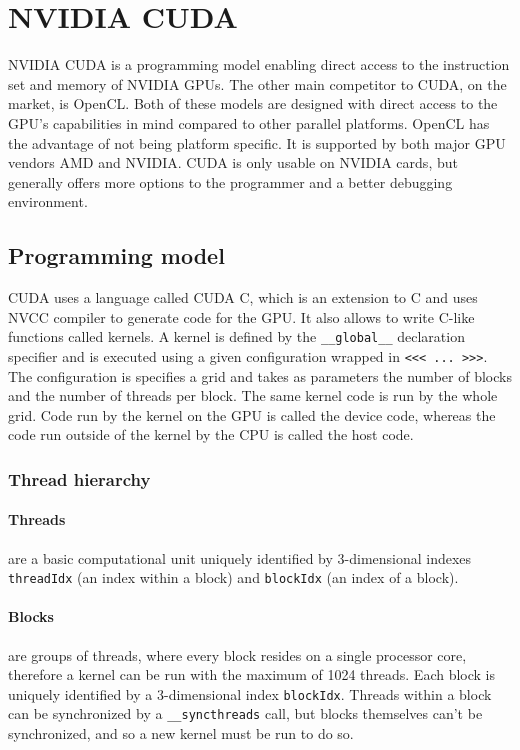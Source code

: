 \section{NVIDIA CUDA}

NVIDIA CUDA is a programming model enabling direct access to the instruction set and memory of NVIDIA GPUs. The other main competitor to CUDA, on the market, is OpenCL. Both of these models are designed with direct access to the GPU's capabilities in mind compared to other parallel platforms. OpenCL has the advantage of not being platform specific. It is supported by both major GPU vendors AMD and NVIDIA. CUDA is only usable on NVIDIA cards, but generally offers more options to the programmer and a better debugging environment.

\subsection{Programming model}

CUDA uses a language called CUDA C, which is an extension to C and uses NVCC compiler to generate code for the GPU. It also allows to write C-like functions called kernels. A kernel is defined by the \verb|__global__| declaration specifier and is executed using a given configuration wrapped in \verb|<<< ... >>>|. The configuration is specifies a grid and takes as parameters the number of blocks and the number of threads per block. The same kernel code is run by the whole grid. Code run by the kernel on the GPU is called the device code, whereas the code run outside of the kernel by the CPU is called the host code.

\subsubsection{Thread hierarchy}\label{subsubsec:thread-hierarchy}

\paragraph{Threads} are a basic computational unit uniquely identified by 3-dimensional indexes \verb|threadIdx| (an index within a block) and \verb|blockIdx| (an index of a block).

\paragraph{Blocks} are groups of threads, where every block resides on a single processor core, therefore a kernel can be run with the maximum of 1024 threads. Each block is uniquely identified by a 3-dimensional index \verb|blockIdx|. Threads within a block can be synchronized by a \verb|__syncthreads| call, but blocks themselves can't be synchronized, and so a new kernel must be run to do so.

